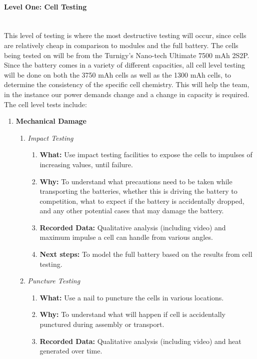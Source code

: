 \documentclass{report}
\let\oldparagraph\paragraph
\renewcommand{\paragraph}[1]{\oldparagraph{#1}\mbox{}\\}
\begin{document}
    \paragraph{Level One: Cell Testing}
    This level of testing is where the most destructive testing will occur, since cells are relatively cheap in comparison to modules and the full battery. The cells being tested on will be from the Turnigy’s Nano-tech Ultimate  7500 mAh 2S2P. Since the battery comes in a variety of different capacities, all cell level testing will be done on both the 3750 mAh cells as well as the 1300 mAh cells, to determine the consistency of the specific cell chemistry. This will help the team, in the instance our power demands change and a change in capacity is required. The cell level tests include:
    \begin{enumerate}
        \item \textbf{Mechanical Damage}
        \begin{enumerate}
            \item \textit{Impact Testing}
            \begin{enumerate}
                \item \textbf{What: }Use impact testing facilities to expose the cells to impulses of increasing values, until failure.
                \item \textbf{Why: }To understand what precautions need to be taken while transporting the batteries, whether this is driving the battery to competition, what to expect if the battery is accidentally dropped, and any other potential cases that may damage the battery.
                \item \textbf{Recorded Data: }Qualitative analysis (including video) and maximum impulse a cell can handle from various angles.
                \item \textbf{Next steps: }To model the full battery based on the results from cell testing.
            \end{enumerate}
            \item \textit{Puncture Testing}
            \begin{enumerate}
                \item \textbf{What: }Use a nail to puncture the cells in various locations.
                \item \textbf{Why: }To understand what will happen if cell is accidentally punctured during assembly or transport.
                \item \textbf{Recorded Data: }Qualitative analysis (including video) and heat generated over time.

\end{enumerate}
\end{enumerate}
\end{enumerate}
\end{document}
